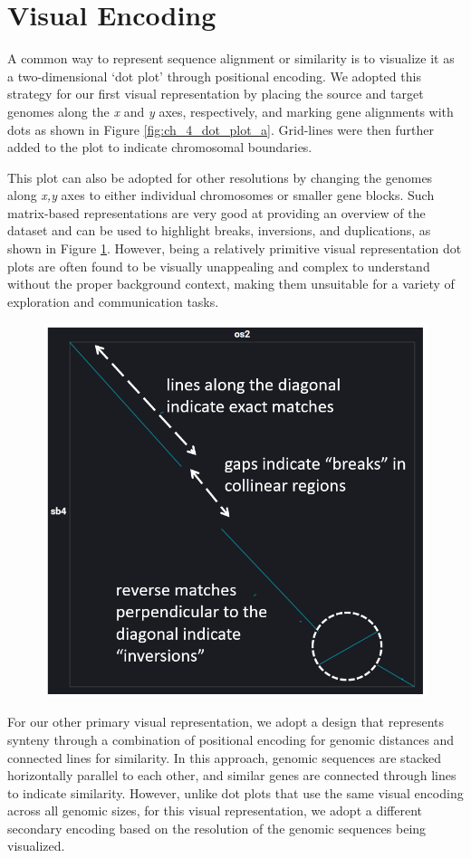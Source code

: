 \section{Visual Encoding}

A common way to represent sequence alignment or similarity is to visualize it as a two-dimensional `dot plot' \cite{SONNHAMMER1995GC1,Cabanettes2018} through positional encoding. We adopted this strategy for our first visual representation by placing the source and target genomes along the \textit{x} and \textit{y} axes, respectively, and marking gene alignments with dots as shown in Figure \ref{fig:ch_4_dot_plot_a}. Grid-lines were then further added to the plot to indicate chromosomal boundaries.



This plot can also be adopted for other resolutions by changing the genomes along \textit{x,y} axes to either individual chromosomes or smaller gene blocks. Such matrix-based representations are very good at providing an overview of the dataset and can be used to highlight breaks, inversions, and duplications, as shown in Figure \ref{fig:ch_4_dot_plot_b}. However, being a relatively primitive visual representation dot plots are often found to be visually unappealing and complex to understand without the proper background context, making them unsuitable for a variety of exploration and communication tasks.


\begin{figure}
  \centering
  \includegraphics[width=.475\linewidth]{images/ch_4_dot_plot_b.PNG}
  \label{fig:ch_4_dot_plot_b}
\end{figure}


For our other primary visual representation, we adopt a design that represents synteny through a combination of positional encoding for genomic distances and connected lines for similarity. In this approach, genomic sequences are stacked horizontally parallel to each other, and similar genes are connected through lines to indicate similarity. However, unlike dot plots that use the same visual encoding across all genomic sizes, for this visual representation, we adopt a different secondary encoding based on the resolution of the genomic sequences being visualized. 

